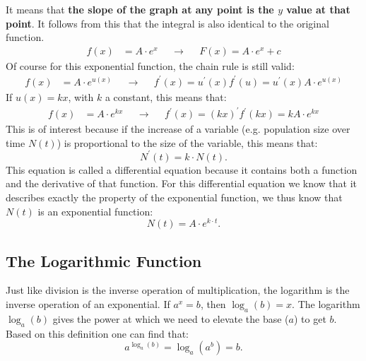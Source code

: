 \documentclass[a4paper]{report}
\begin{document}
It means that \textbf{the slope of the graph at any point is the $y$ value at that
point}. It follows from this that the integral is also identical to the original function.
\begin{align}
f(x)& = A \cdot e^x & &\rightarrow& &F(x) =  A \cdot e^x  + c
\end{align}
Of course for this exponential function, the chain rule is still valid:
\begin{align}
f(x)& = A \cdot e^{u(x)} & &\rightarrow& & f^\prime(x) = u^\prime(x)f^\prime(u) = u^\prime(x)A \cdot e^{u(x)} 
\end{align}
If $u(x)=kx$, with $k$ a constant, this means that:
\begin{align}
f(x)& = A \cdot e^{kx} & &\rightarrow& & f^\prime(x) = (kx)^\prime f^\prime(kx) = kA \cdot e^{kx} 
\end{align}
This is of interest because if the increase of a variable (e.g. population size over time $N(t)$) is proportional to the size of the variable, this means that:
\begin{equation}
N^\prime(t)=k \cdot N(t).
\end{equation}
This equation is called a differential equation because it contains both a function and the derivative of that function. For this differential equation we know that it describes exactly the property of the exponential function, we thus know that $N(t)$ is an exponential function:
\begin{equation}
N(t)=A \cdot e^{k \cdot t}.
\end{equation}

\subsection{The Logarithmic Function}
Just like division is the inverse operation of multiplication, the logarithm is the inverse operation of an exponential. If $a^x=b$, then $\log_a(b)=x$. The logarithm $\log_a(b)$ gives the power at which we need to elevate the base ($a$) to get $b$. Based on this definition one can find that:
\begin{equation*}
a^{\log_a(b)} = \log_a(a^b) = b.
\end{equation*}
\end{document}
